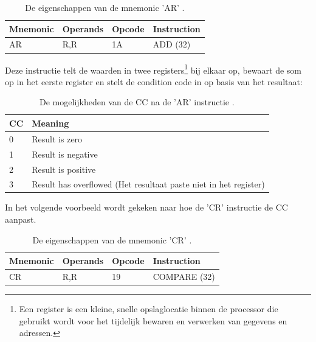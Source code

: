 \begin{table}[h!]
    \centering
    \small
    \begin{tabular}{|p{3cm}|p{3cm}|p{3cm}|p{3cm}|}
        \hline
        \textbf{Mnemonic} & \textbf{Operands} & \textbf{Opcode} & \textbf{Instruction} \\
        \hline
        AR & R,R & 1A & ADD (32) \\
        \hline
    \end{tabular}
    \caption{De eigenschappen van de mnemonic 'AR' \autocite{hlasm_table_instructions_2025}.}
    \label{tab:AR}
\end{table}

Deze instructie telt de waarden in twee registers\footnote{Een register is een kleine, snelle opslaglocatie binnen de processor die gebruikt wordt voor het tijdelijk bewaren en verwerken van gegevens en adressen.} bij elkaar op, bewaart de som op in het eerste register en stelt de condition code in op basis van het resultaat:

\begin{table}[h!]
    \centering
    \small
    \begin{tabular}{|p{3cm}|p{7cm}|}
        \hline
        \textbf{CC} & \textbf{Meaning} \\
        \hline
        0 & Result is zero \\
        \hline
        1 & Result is negative \\
        \hline
        2 & Result is positive \\
        \hline
        3 & Result has overflowed (Het resultaat paste niet in het register)  \\
        \hline
    \end{tabular}
    \caption{De mogelijkheden van de CC na de 'AR' instructie \autocite{principles_of_operation_2022}.}
    \label{tab:ccAR}
\end{table}

In het volgende voorbeeld wordt gekeken naar hoe de 'CR' instructie de CC aanpast. 

\begin{table}[h!]
    \centering
    \small
    \begin{tabular}{|p{3cm}|p{3cm}|p{3cm}|p{3cm}|}
        \hline
        \textbf{Mnemonic} & \textbf{Operands} & \textbf{Opcode} & \textbf{Instruction} \\
        \hline
        CR & R,R & 19 & COMPARE (32) \\
        \hline
    \end{tabular}
    \caption{De eigenschappen van de mnemonic 'CR' \autocite{hlasm_table_instructions_2025}.}
    \label{tab:CR}
\end{table}

